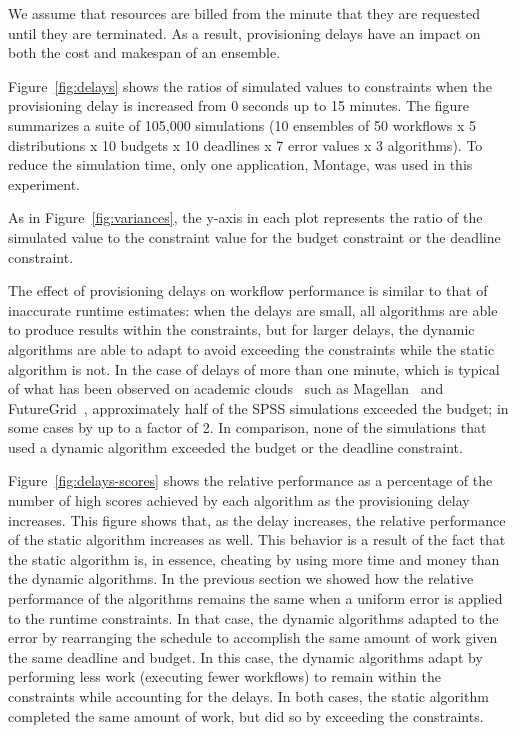 \documentclass[preprint,5p]{elsarticle}
\begin{document}
We assume that resources are billed from the minute that they are requested
until they are terminated.  As a result, provisioning delays have an impact on
both the cost and makespan of an ensemble.

Figure~\ref{fig:delays} shows the ratios of simulated values to constraints when
the provisioning delay is increased from 0 seconds up to 15 minutes. The
figure summarizes a suite of 105,000 simulations (10 ensembles of 50 workflows
x 5 distributions x 10 budgets x 10 deadlines x 7 error values x 3
algorithms). To reduce the simulation time, only one application, Montage, was
used in this experiment. 

As in Figure~\ref{fig:variances}, the y-axis in each
plot represents the ratio of the simulated value to the constraint value for
the budget constraint or the deadline constraint.


The effect of provisioning delays on workflow performance is similar to that of
inaccurate runtime estimates: when the delays are small, all algorithms are able
to produce results within the constraints, but for larger delays, the dynamic
algorithms are able to adapt to avoid exceeding the constraints while the static
algorithm is not. In the case of delays of more than one minute, which is
typical of what has been observed on academic clouds~\cite{Juve2011} such as
Magellan~\cite{Magellan} and FutureGrid~\cite{FutureGrid}, approximately half of
the SPSS simulations exceeded the budget; in some cases by up to a factor of 2.
In comparison, none of the simulations that used a dynamic algorithm exceeded
the budget or the deadline constraint.


Figure~\ref{fig:delays-scores} shows the relative performance as a
percentage of the number of high scores achieved by each algorithm as the
provisioning delay increases. This figure shows that, as the delay
increases, the relative performance of the static algorithm increases as
well. This behavior is a result of the fact that the static algorithm is, in
essence, cheating by using more time and money than the dynamic algorithms.
In the previous section we showed how the relative performance of the
algorithms remains the same when a uniform error is applied to the runtime
constraints. In that case, the dynamic algorithms adapted to the error by
rearranging the schedule to accomplish the same amount of work given the
same deadline and budget. In this case, the dynamic algorithms adapt by
performing less work (executing fewer workflows) to remain within the
constraints while accounting for the delays. In both cases, the static
algorithm completed the same amount of work, but did so by exceeding the
constraints.
\end{document}

